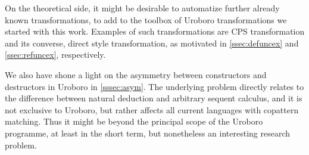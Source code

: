 On the theoretical side, it might be desirable to automatize further already known transformations, to add to the toolbox of Uroboro transformations we started with this work. Examples of such transformations are CPS transformation and its converse, direct style transformation, as motivated in \autoref{ssec:defuncex} and \autoref{ssec:refuncex}, respectively.

We also have shone a light on the asymmetry between constructors and destructors in Uroboro in \autoref{sssec:asym}. The underlying problem directly relates to the difference between natural deduction and arbitrary sequent calculus, and it is not exclusive to Uroboro, but rather affects all current languages with copattern matching. Thus it might be beyond the principal scope of the Uroboro programme, at least in the short term, but nonetheless an interesting research problem.
